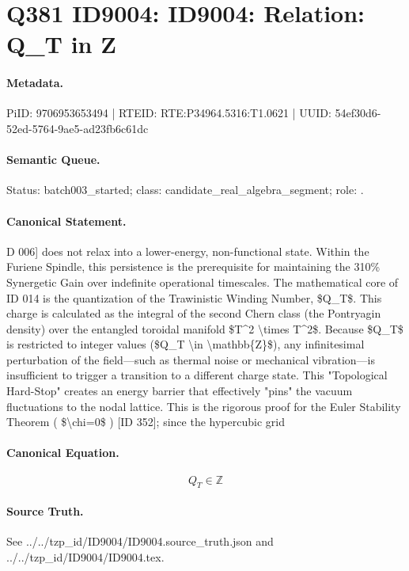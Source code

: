 \section*{Q381 ID9004: ID9004: Relation: Q\_T in Z}
\paragraph{Metadata.}
PiID: 9706953653494 | RTEID: RTE:P34964.5316:T1.0621 | UUID: 54ef30d6-52ed-5764-9ae5-ad23fb6c61dc

\paragraph{Semantic Queue.}
Status: batch003\_started; class: candidate\_real\_algebra\_segment; role: .

\paragraph{Canonical Statement.}
D 006] does not relax into a lower-energy, non-functional state. Within the Furiene Spindle, this persistence is the prerequisite for maintaining the 310\% Synergetic Gain over indefinite operational timescales. The mathematical core of ID 014 is the quantization of the Trawinistic Winding Number, \$Q\_T\$. This charge is calculated as the integral of the second Chern class (the Pontryagin density) over the entangled toroidal manifold \$T\textasciicircum{}2 \textbackslash{}times T\textasciicircum{}2\$. Because \$Q\_T\$ is restricted to integer values (\$Q\_T \textbackslash{}in \textbackslash{}mathbb\{Z\}\$), any infinitesimal perturbation of the field—such as thermal noise or mechanical vibration—is insufficient to trigger a transition to a different charge state. This "Topological Hard-Stop" creates an energy barrier that effectively "pins" the vacuum fluctuations to the nodal lattice. This is the rigorous proof for the Euler Stability Theorem ( \$\textbackslash{}chi=0\$ ) [ID 352]; since the hypercubic grid

\paragraph{Canonical Equation.}
\[
Q_T \in \mathbb{Z}
\]

\paragraph{Source Truth.}
See ../../tzp\_id/ID9004/ID9004.source\_truth.json and ../../tzp\_id/ID9004/ID9004.tex.
